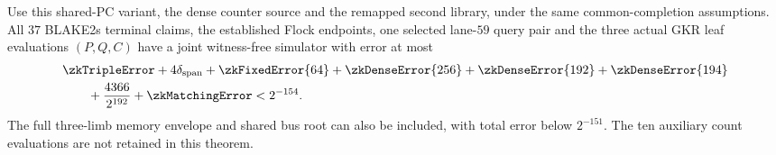 \begin{theorem}\label{thm:zk-flock-leaf-interface}
Use this shared-PC variant, the dense counter source and the remapped second library, under the same common-completion assumptions. All $37$ BLAKE2s terminal claims, the established Flock endpoints, one selected lane-$59$ query pair and the three actual GKR leaf evaluations $(P,Q,C)$ have a joint witness-free simulator with error at most
\[
 \begin{aligned}
 &\zkTripleError+4\delta_{\mathrm{span}}+\zkFixedError{64}
 +\zkDenseError{256}+\zkDenseError{192}+\zkDenseError{194}\\
 &\hspace{2em}+\frac{4366}{2^{192}}+\zkMatchingError<2^{-154}.
 \end{aligned}
\]
The full three-limb memory envelope and shared bus root can also be included, with total error below $2^{-151}$. The ten auxiliary count evaluations are not retained in this theorem.
\end{theorem}

